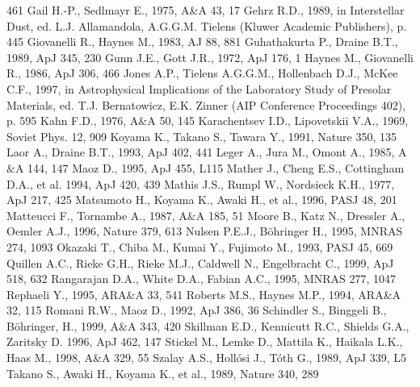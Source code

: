 \documentclass[]{aa}
\begin{document}
\begin{thebibliography}{}
461
\bibitem{} Gail H.-P., Sedlmayr E., 1975, A\&A 43, 17
\bibitem{} Gehrz R.D., 1989, in Interstellar Dust, ed. L.J. Allamandola,
A.G.G.M. Tielens (Kluwer Academic Publishers), p. 445
\bibitem{} Giovanelli R., Haynes M., 1983, AJ 88, 881
\bibitem{} Guhathakurta P., Draine B.T., 1989, ApJ 345, 230
\bibitem{} Gunn J.E., Gott J.R., 1972, ApJ 176, 1
\bibitem{} Haynes M., Giovanelli R., 1986, ApJ 306, 466
\bibitem{} Jones A.P., Tielens A.G.G.M., Hollenbach D.J., McKee C.F., 1997, 
in Astrophysical Implications of the Laboratory Study of Presolar
Materials, ed. T.J. Bernatowicz, E.K. Zinner 
(AIP Conference Proceedings 402), p. 595
\bibitem{} Kahn F.D., 1976, A\&A 50, 145
\bibitem{} Karachentsev I.D., Lipovetskii V.A., 1969, Soviet Phys. 12, 909 
\bibitem{} Koyama K., Takano S., Tawara Y., 1991, Nature 350, 135
\bibitem{} Laor A., Draine B.T., 1993, ApJ 402, 441
\bibitem{} Leger A., Jura M., Omont A., 1985, A$\&$A 144, 147
\bibitem{} Maoz D., 1995, ApJ 455, L115
\bibitem{} Mather J., Cheng E.S., Cottingham D.A., et al. 1994, ApJ 420, 439
\bibitem{} Mathis J.S., Rumpl W., Nordsieck K.H., 1977, ApJ 217, 425
\bibitem{} Matsumoto H., Koyama K., Awaki H., et al., 1996, PASJ 48, 201
\bibitem{} Matteucci F., Tornambe A., 1987, A$\&$A 185, 51
\bibitem{} Moore B., Katz N., Dressler A., Oemler A.J., 1996, 
Nature 379, 613
\bibitem{} Nulsen P.E.J., B\"ohringer H., 1995, MNRAS 274, 1093
\bibitem{} Okazaki T., Chiba M., Kumai Y., Fujimoto M., 1993, PASJ 
45, 669
\bibitem{} Quillen A.C., Rieke G.H., Rieke M.J., Caldwell N., 
Engelbracht C., 1999, ApJ 518, 632
\bibitem{} Rangarajan D.A., White D.A., Fabian A.C., 1995, 
MNRAS 277, 1047 
\bibitem{} Rephaeli Y., 1995, ARA\&A 33, 541
\bibitem{} Roberts M.S., Haynes M.P., 1994, ARA\&A 32, 115
\bibitem{} Romani R.W., Maoz D., 1992, ApJ 386, 36
\bibitem{} Schindler S., Binggeli B., B\"ohringer, H., 1999, A\&A 343, 420
\bibitem{} Skillman E.D., Kennicutt R.C., Shields G.A., Zaritsky D. 1996, 
ApJ 462, 147
\bibitem{} Stickel M., Lemke D., Mattila K., Haikala L.K., Haas M., 
1998, A\&A 329, 55
\bibitem{} Szalay A.S., Holl\'osi J., T\'oth G., 1989, ApJ 339, L5
\bibitem{} Takano S., Awaki H., Koyama K., et al., 1989, Nature 340, 289

\end{thebibliography}
\end{document}
